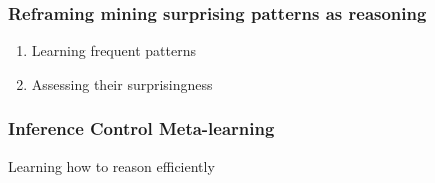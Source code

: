 \documentclass{beamer}
\begin{document}
\begin{frame}
  \frametitle{Reframing \alert{mining surprising patterns as
      reasoning}}







  \begin{enumerate}
  \item Learning \alert{frequent} patterns
  \item Assessing their \alert{surprisingness}
  \end{enumerate}

\end{frame}

\begin{frame}
  \frametitle{Inference Control Meta-learning}





  \begin{center}\alert{Learning how to reason efficiently}\end{center}
\end{frame}
\end{document}
